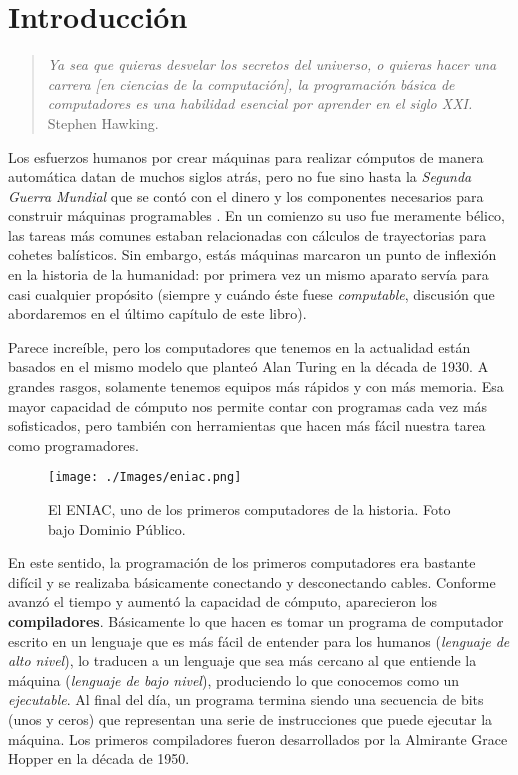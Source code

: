 \chapter{Introducción}

\begin{quote}
\emph{Ya sea que quieras desvelar los secretos del universo, o quieras hacer una carrera [en ciencias de la computación], la programación básica de computadores es una habilidad esencial por aprender en el siglo XXI.} \\
Stephen Hawking.
\end{quote}

Los esfuerzos humanos por crear máquinas para realizar cómputos de manera automática datan de muchos siglos atrás, pero no fue sino hasta la \emph{Segunda Guerra Mundial} que se contó con el dinero y los componentes necesarios para construir máquinas programables \cite[p.~108]{evansIntro}. En un comienzo su uso fue meramente bélico, las tareas más comunes estaban relacionadas con cálculos de trayectorias para cohetes balísticos. Sin embargo, estás máquinas marcaron un punto de inflexión en la historia de la humanidad: por primera vez un mismo aparato servía para casi cualquier propósito (siempre y cuándo éste fuese \emph{computable}, discusión que abordaremos en el último capítulo de este libro).

Parece increíble, pero los computadores que tenemos en la actualidad están basados en el mismo modelo que planteó Alan Turing en la década de 1930. A grandes rasgos, solamente tenemos equipos más rápidos y con más memoria. Esa mayor capacidad de cómputo nos permite contar con programas cada vez más sofisticados, pero también con herramientas que hacen más fácil nuestra tarea como programadores.
 \newpage

\begin{wrapfigure}{r}{0.5\textwidth}
	\begin{center}
	\texttt{[image: ./Images/eniac.png]}
	\end{center}	
	\caption{El ENIAC, uno de los primeros computadores de la historia. Foto bajo  Dominio Público.}
\end{wrapfigure}

En este sentido, la programación de los primeros computadores era bastante difícil y se realizaba básicamente conectando y desconectando cables. Conforme avanzó el tiempo y aumentó la capacidad de cómputo, aparecieron los \textbf{compiladores}. Básicamente lo que hacen es tomar un programa de computador escrito en un lenguaje que es más fácil de entender para los humanos (\emph{lenguaje de alto nivel}), lo traducen a un lenguaje que sea más cercano al que entiende la máquina (\emph{lenguaje de bajo nivel}), produciendo lo que conocemos como un \emph{ejecutable}. Al final del día, un programa termina siendo una secuencia de bits (unos y ceros) que representan una serie de instrucciones que puede ejecutar la máquina. Los primeros compiladores fueron desarrollados por la Almirante Grace Hopper en la década de 1950.

